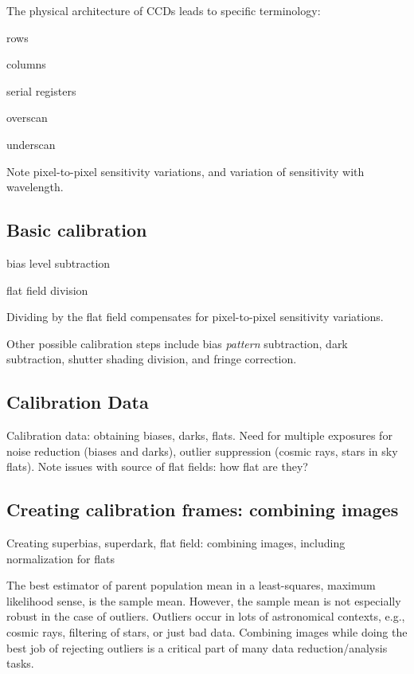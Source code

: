 \documentclass{article}
\begin{document}
The physical architecture of CCDs leads to specific terminology:
\begin{itemize*}
    \item rows
    \item columns
    \item serial registers
    \item overscan
    \item underscan
\end{itemize*}
Note pixel-to-pixel sensitivity variations, and variation of
sensitivity with wavelength.

\subsection*{Basic calibration}
\begin{enumerate*}
    \item bias level subtraction
    \item flat field division
\end{enumerate*}
Dividing by the flat field compensates for pixel-to-pixel
sensitivity variations.
\par Other possible calibration steps include bias \emph{pattern} subtraction,
dark subtraction, shutter shading division, and fringe correction.

\subsection*{Calibration Data}
Calibration data: obtaining biases, darks, flats. Need for multiple
exposures for noise reduction (biases and darks), outlier suppression
(cosmic rays, stars in sky flats). Note issues with source of flat
fields: how flat are they?

\subsection*{Creating calibration frames: combining images}
Creating superbias, superdark, flat field: combining images, including
normalization for flats

The best estimator of parent population mean in a least-squares,
maximum likelihood sense, is the sample mean. However, the sample mean
is not especially robust in the case of outliers. Outliers occur in
lots of astronomical contexts, e.g., cosmic rays, filtering of stars,
or just bad data. Combining images while doing the best job of
rejecting outliers is a critical part of many data reduction/analysis
tasks.
\end{document}
